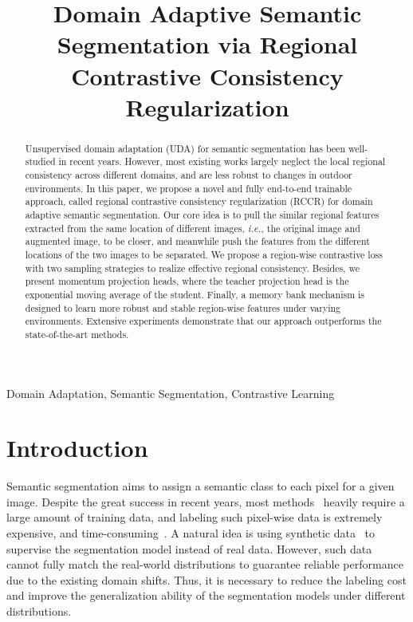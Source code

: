 \documentclass{article}
\begin{document}
\sloppy



\def\x{{\mathbf x}}
\def\L{{\cal L}}


\title{Domain Adaptive Semantic Segmentation via Regional Contrastive Consistency Regularization}


\address{ Shanghai Jiao Tong University Deakin University \\ \{zhouqianyu,fallen,ranyi\}@sjtu.edu.cn,  xuequan.lu@deakin.edu.au, ma-lz@cs.sjtu.edu.cn}


\maketitle


\begin{abstract}
Unsupervised domain adaptation (UDA) for semantic segmentation has been well-studied in recent years. However, most existing works largely neglect the local regional consistency across different domains, and are less robust to changes in outdoor environments. In this paper, we propose a novel and fully end-to-end trainable approach, called regional contrastive consistency regularization (RCCR) for domain adaptive semantic segmentation. Our core idea is to pull the similar regional features extracted from the same location of different images, \emph{i.e.,} the original image and augmented image, to be closer, and meanwhile push the features from the different locations of the two images to be separated. We propose a region-wise contrastive loss with two sampling strategies to realize effective regional consistency. Besides, we present momentum projection heads, where the teacher projection head is the exponential moving average of the student. Finally, a memory bank mechanism is designed to learn more robust and stable region-wise features under varying environments. Extensive experiments demonstrate that our approach outperforms the state-of-the-art methods.
\end{abstract}
\begin{keywords}
Domain Adaptation, Semantic Segmentation, Contrastive Learning
\end{keywords}


\section{Introduction}

Semantic segmentation aims to assign a semantic class to each pixel for a given image. Despite the great success in recent years, most methods~\cite{chen2018deeplab} heavily require a large amount of training data, and labeling such pixel-wise data is extremely expensive, and time-consuming~\cite{cordts2016cityscapes}.  
A natural idea is using synthetic data~\cite{stephan2016gtav,ros2016synthia} to supervise the segmentation model instead of real data.
However, such data cannot fully match the real-world distributions to guarantee reliable performance due to the existing domain shifts. 
Thus, it is necessary to reduce the labeling cost and improve the generalization ability of the segmentation models under different distributions. 
\end{document}
